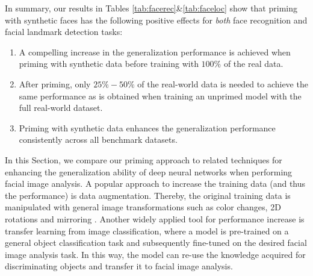 \documentclass[10pt,twocolumn,letterpaper]{article}
\begin{document}
    In summary, our results in Tables \ref{tab:facerec}\&\ref{tab:faceloc} show that priming with synthetic faces has the following positive effects for \textit{both} face recognition and facial landmark detection tasks:
    \begin{enumerate} 	    
    	\item A compelling increase in the generalization performance is achieved when priming with synthetic data before training with $100\%$ of the real data.
     	\item After priming, only $25\%-50\%$ of the real-world data is needed to achieve the same performance as is obtained when training an unprimed model with the full real-world dataset.
    	\item Priming with synthetic data enhances the generalization performance consistently across all benchmark datasets.
    \end{enumerate}%
   
   In this Section, we compare our priming approach to related techniques for enhancing the generalization ability of deep neural networks when performing facial image analysis. A popular approach to increase the training data (and thus the performance) is data augmentation. Thereby, the original training data is manipulated with general image transformations such as color changes, 2D rotations and mirroring \cite{chatfield2014return,yang2015mirror,wolf2011effective,chen2012dictionary}. Another widely applied tool for performance increase is transfer learning from image classification, where a model is pre-trained on a general object classification task and subsequently fine-tuned on the desired facial image analysis task. In this way, the model can re-use the knowledge acquired for discriminating objects and transfer it to facial image analysis.
   
\end{document}
